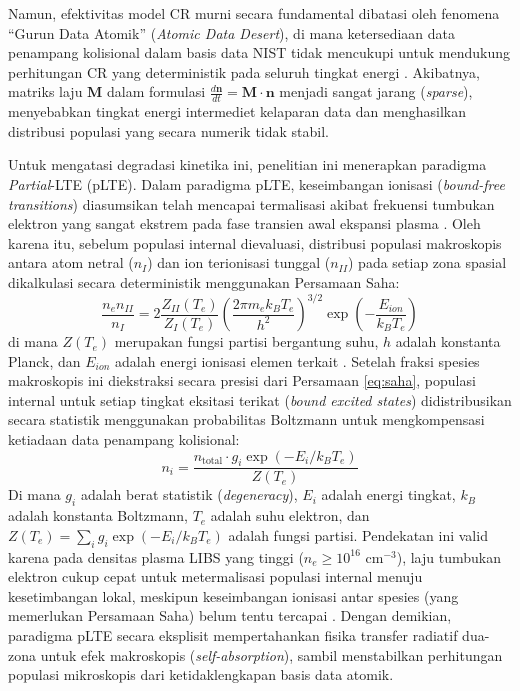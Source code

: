 \documentclass[10pt,leqno]{amsart}
\begin{document}
Namun, efektivitas model CR murni secara fundamental dibatasi oleh fenomena ``Gurun Data Atomik'' (\textit{Atomic Data Desert}), di mana ketersediaan data penampang kolisional dalam basis data NIST tidak mencukupi untuk mendukung perhitungan CR yang deterministik pada seluruh tingkat energi \cite{bultel_mcwhirter_2025,favre_merlin_2025}. Akibatnya, matriks laju $\mathbf{M}$ dalam formulasi $\frac{d\mathbf{n}}{dt} = \mathbf{M} \cdot \mathbf{n}$ menjadi sangat jarang (\textit{sparse}), menyebabkan tingkat energi intermediet kelaparan data dan menghasilkan distribusi populasi yang secara numerik tidak stabil.

Untuk mengatasi degradasi kinetika ini, penelitian ini menerapkan paradigma \textit{Partial}-LTE (pLTE). Dalam paradigma pLTE, keseimbangan ionisasi (\textit{bound-free transitions}) diasumsikan telah mencapai termalisasi akibat frekuensi tumbukan elektron yang sangat ekstrem pada fase transien awal ekspansi plasma \cite{cristoforetti_local_2010}. Oleh karena itu, sebelum populasi internal dievaluasi, distribusi populasi makroskopis antara atom netral ($n_I$) dan ion terionisasi tunggal ($n_{II}$) pada setiap zona spasial dikalkulasi secara deterministik menggunakan Persamaan Saha:
\begin{equation} \label{eq:saha}
\frac{n_{e} n_{II}}{n_{I}} = 2 \frac{Z_{II}(T_e)}{Z_{I}(T_e)} \left( \frac{2\pi m_e k_B T_e}{h^2} \right)^{3/2} \exp\left(-\frac{E_{ion}}{k_B T_e}\right)
\end{equation}
di mana $Z(T_e)$ merupakan fungsi partisi bergantung suhu, $h$ adalah konstanta Planck, dan $E_{ion}$ adalah energi ionisasi elemen terkait \cite{bultel_mcwhirter_2025}. Setelah fraksi spesies makroskopis ini diekstraksi secara presisi dari Persamaan \ref{eq:saha}, populasi internal untuk setiap tingkat eksitasi terikat (\textit{bound excited states}) didistribusikan secara statistik menggunakan probabilitas Boltzmann untuk mengkompensasi ketiadaan data penampang kolisional:
\begin{equation} \label{eq:boltzmann_plte}
n_i = \frac{n_{\text{total}} \cdot g_i \exp\left(-E_i / k_B T_e\right)}{Z(T_e)}
\end{equation}
Di mana $g_i$ adalah berat statistik (\textit{degeneracy}), $E_i$ adalah energi tingkat, $k_B$ adalah konstanta Boltzmann, $T_e$ adalah suhu elektron, dan $Z(T_e) = \sum_i g_i \exp(-E_i/k_B T_e)$ adalah fungsi partisi. Pendekatan ini valid karena pada densitas plasma LIBS yang tinggi ($n_e \ge 10^{16}$ cm$^{-3}$), laju tumbukan elektron cukup cepat untuk metermalisasi populasi internal menuju kesetimbangan lokal, meskipun keseimbangan ionisasi antar spesies (yang memerlukan Persamaan Saha) belum tentu tercapai \cite{cristoforetti_local_2010,bultel_mcwhirter_2025}. Dengan demikian, paradigma pLTE secara eksplisit mempertahankan fisika transfer radiatif dua-zona untuk efek makroskopis (\textit{self-absorption}), sambil menstabilkan perhitungan populasi mikroskopis dari ketidaklengkapan basis data atomik.
\end{document}
